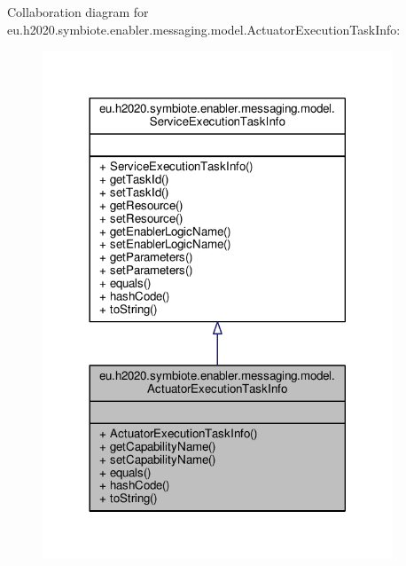 Collaboration diagram for eu.\+h2020.\+symbiote.\+enabler.\+messaging.\+model.\+Actuator\+Execution\+Task\+Info\+:\nopagebreak
\begin{figure}[H]
\begin{center}
\leavevmode
\includegraphics[width=296pt]{classeu_1_1h2020_1_1symbiote_1_1enabler_1_1messaging_1_1model_1_1ActuatorExecutionTaskInfo__coll__graph}
\end{center}
\end{figure}
